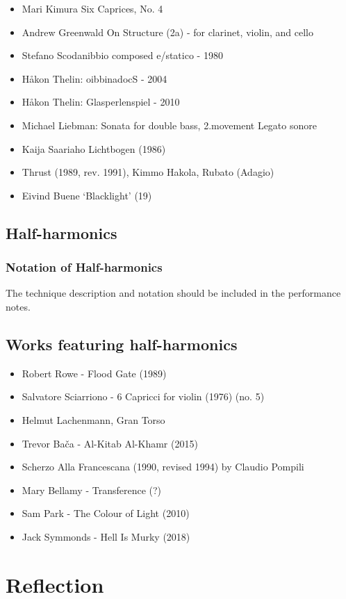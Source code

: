 \begin{itemize}
    \item Mari Kimura Six Caprices, No. 4 
    \item Andrew Greenwald On Structure (2a) - for clarinet, violin, and cello
    \item Stefano Scodanibbio composed e/statico - 1980
    \item Håkon Thelin: oibbinadocS - 2004
    \item Håkon Thelin: Glasperlenspiel - 2010
    \item Michael Liebman: Sonata for double bass, 2.movement Legato sonore
    \item Kaija Saariaho Lichtbogen (1986)
    \item Thrust (1989, rev. 1991),  Kimmo Hakola, Rubato (Adagio) 
    \item Eivind Buene `Blacklight' (19)
\end{itemize}

\subsection{Half-harmonics}

\subsubsection{Notation of Half-harmonics}

The technique description and notation should be included in the performance notes.


\subsection{Works featuring half-harmonics}

\begin{itemize}
    \item Robert Rowe - Flood Gate (1989)
    \item Salvatore Sciarriono - 6 Capricci for violin (1976) (no. 5)
    \item Helmut Lachenmann, Gran Torso
    \item Trevor Bača - Al-Kitab Al-Khamr (2015)
    \item Scherzo Alla Francescana (1990, revised 1994) by Claudio Pompili 
    \item Mary Bellamy - Transference (?)
    \item Sam Park - The Colour of Light (2010)
    \item Jack Symmonds - Hell Is Murky (2018)
\end{itemize}

\section{Reflection}




\lipsum[4]